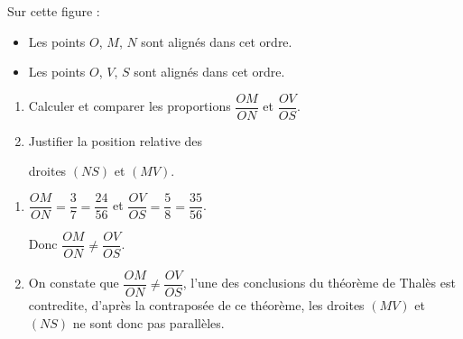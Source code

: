 \begin{exercice*}
    Sur cette figure :
    \begin{itemize}
        \item Les points $O$, $M$, $N$ sont alignés dans cet ordre.
        \item Les points $O$, $V$, $S$ sont alignés dans cet ordre.
    \end{itemize}

    \begin{enumerate}
        \item Calculer et comparer les proportions $\dfrac{OM}{ON}$ et $\dfrac{OV}{OS}$.
        \item Justifier la position relative des 
        
        droites $(NS)$ et $(MV)$.
    \end{enumerate}
    

\end{exercice*}
\begin{corrige}

    \begin{enumerate}
        \item $\dfrac{OM}{ON}=\dfrac{3}{7}=\dfrac{24}{56}$ et $\dfrac{OV}{OS}=\dfrac{5}{8}=\dfrac{35}{56}$.
        
        Donc $\dfrac{OM}{ON}\neq\dfrac{OV}{OS}$.
        \item On constate que $\dfrac{OM}{ON}\neq\dfrac{OV}{OS}$, l'une des conclusions du théorème de Thalès est contredite, 
        d'après la contraposée de ce théorème, les droites $(MV)$ et $(NS)$ ne sont donc pas parallèles.
    \end{enumerate}

\end{corrige}


